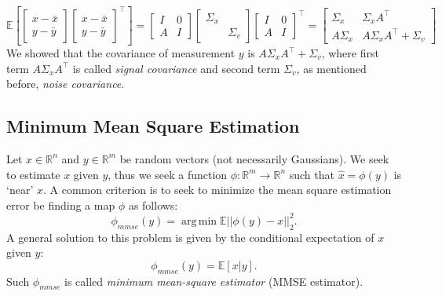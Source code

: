 \documentclass{article}[12pt]
\def\E{\E}
\DeclareMathOperator*{\argmin}{arg\,min}
\def \E{\mathbb E}
\def \A{\cal A}
\begin{document}
\begin{equation}
\E \left[\begin{bmatrix}
x -\bar{x}\\ y-\bar{y}
\end{bmatrix}
\begin{bmatrix}
x -\bar{x}\\ y-\bar{y}
\end{bmatrix}^\top
 \right]=
\begin{bmatrix}
I & 0\\A &I
\end{bmatrix}
\begin{bmatrix}
\Sigma_x & \\ & \Sigma_v
\end{bmatrix}
\begin{bmatrix}
I & 0\\A& I
\end{bmatrix}^\top = 
\begin{bmatrix}
\Sigma_x& \Sigma_x A^\top \\
A\Sigma_x & A\Sigma_x A^\top + \Sigma_v
\end{bmatrix}
\end{equation}
We showed that the covariance of measurement $y$ is $A\Sigma_x A^\top + \Sigma_v$, where first term $A\Sigma_x A^\top$ is called \textit{signal covariance} and second term $\Sigma_v$, as mentioned before, \textit{noise covariance}.
\subsection{Minimum Mean Square Estimation}
Let $x\in\mathbb{R}^n$ and $y\in\mathbb{R}^m$ be random vectors (not necessarily Gaussians). We seek to estimate $x$ given $y$, thus we seek a function $\phi:\mathbb{R}^m\to \mathbb{R}^n$ such that $\hat{x}=\phi(y)$ is `near' $x$. A common criterion is to seek to minimize the mean square estimation error be finding a map $\phi$ as follows:
\begin{equation}
\phi_{mmse}(y) = \argmin \E ||\phi(y)-x||_2^2.
\end{equation}
A general solution to this problem is given by the conditional expectation of $x$ given $y$:
\begin{equation}
\phi_{mmse}(y) = \E [x|y].
\end{equation}
Such $\phi_{mmse}$ is called \textit{minimum mean-square estimator} (MMSE estimator).
\end{document}
